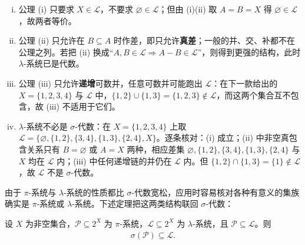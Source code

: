 \documentclass[../../main.tex]{subfiles}
\begin{document}
\begin{remark}\label{remark:ch01-def-1-8-差分条件}
\begin{enumerate}[(i)]
\item 公理 (i) 只要求 $X\in\mathcal{L}$，不要求 $\varnothing\in\mathcal{L}$；但由 (i)(ii) 取 $A=B=X$ 得 $\varnothing\in\mathcal{L}$，故两者等价。
\item 公理 (ii) 只允许在 $B\subseteq A$ 时作差，即只允许\textbf{真差}；一般的并、交、补都不在公理之列。若把 (ii) 换成“$A,B\in\mathcal{L}\Rightarrow A-B\in\mathcal{L}$”，则得到更强的结构，此时 $\lambda$-系统已是代数。
\item 公理 (iii) 只允许\textbf{递增}可数并，任意可数并可能跑出 $\mathcal{L}$：在下一款给出的 $X=\{1,2,3,4\}$ 与 $\mathcal{L}$ 中，$\{1,2\}\cup\{1,3\}=\{1,2,3\}\notin\mathcal{L}$，而这两个集合互不包含，故 (iii) 不适用于它们。
\item $\lambda$-系统不必是 $\sigma$-代数：在 $X=\{1,2,3,4\}$ 上取 $\mathcal{L}=\{\varnothing,\{1,2\},\{3,4\},\{1,3\},\{2,4\},X\}$。逐条核对：(i) 成立；(ii) 中非空真包含关系只有 $B=\varnothing$ 或 $A=X$ 两种，相应差集 $\varnothing,\{1,2\},\{3,4\},\{1,3\},\{2,4\}$ 与 $X$ 均在 $\mathcal{L}$ 内；(iii) 中任何递增链的并仍在 $\mathcal{L}$ 内。但 $\{1,2\}\cap\{1,3\}=\{1\}\notin\mathcal{L}$，故 $\mathcal{L}$ 不是 $\sigma$-代数。
\end{enumerate}
\end{remark}

由于 $\pi$-系统与 $\lambda$-系统的性质都比 $\sigma$-代数宽松，应用时容易核对各种有意义的集族确实是 $\pi$-系统或 $\lambda$-系统。下述定理把这两类结构联回 $\sigma$-代数：

\begin{theorem}[$\pi$-$\lambda$ 定理]\label{theorem:ch01-1-4}
设 $X$ 为非空集合，$\mathcal{P}\subseteq2^{X}$ 为 $\pi$-系统，$\mathcal{L}\subseteq2^{X}$ 为 $\lambda$-系统，且 $\mathcal{P}\subseteq\mathcal{L}$。则
\begin{align*}
\sigma(\mathcal{P})\subseteq\mathcal{L}.
\end{align*}
\end{theorem}
\end{document}
